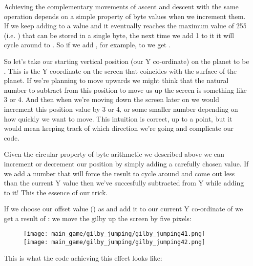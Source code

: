 Achieving the complementary movements of ascent and descent with the same operation depends on a simple property of byte values when we increment them. If we keep adding
to a value and it eventually reaches the maximum value of 255 (i.e. ) that can be stored in a single byte,
 the next time we add 1 to it it will cycle around to . So if we add , for example, to  
 we get . 

So let's take our starting vertical position (our Y co-ordinate) on the planet to be . This is the Y-coordinate on the
screen that coincides with the surface of the planet. If we're planning to move upwards we might think that the natural number
to subtract from this position to move us up the screen is something like 3 or 4. And then when we're moving down the screen later
on we would increment this position value by 3 or 4, or some smaller number depending on how quickly we want to move. This intuition
is correct, up to a point, but it would mean keeping track of which direction we're going and complicate our code.

Given the circular property of byte arithmetic we described above we can increment or decrement our position by simply adding a carefully
chosen value. If we add a number that will force the result to cycle around and come out less than the current Y value then we've
succesfully subtracted from Y while adding to it! This the essence of our trick.

If we choose our offset value () as  and add it to our current Y co-ordinate
of  we get a result of : we move the gilby up the screen by five pixels:

\begin{figure}[H]
    \centering
      \texttt{[image: main\_game/gilby\_jumping/gilby\_jumping41.png]}%
      \texttt{[image: main\_game/gilby\_jumping/gilby\_jumping42.png]}%
\end{figure}

This is what the code achieving this effect looks like:

